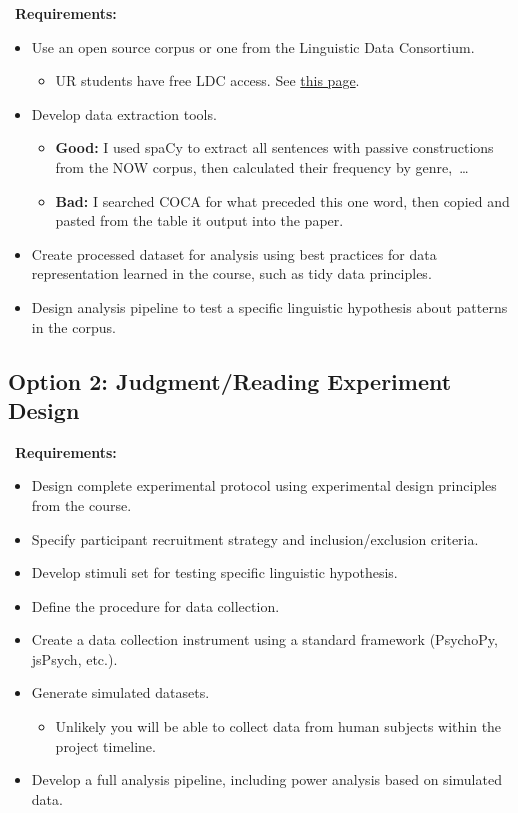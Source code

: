 \documentclass[10pt,letterpaper]{article}
\begin{document}
\begin{graybox}
\faClipboardCheck\ \textbf{Requirements:}
\begin{itemize}
  \item Use an open source corpus or one from the Linguistic Data Consortium.
    \begin{itemize}
      \item UR students have free LDC access. See \href{https://www.library.rochester.edu/about/policies/linguistic-data-consortium-ldc}{this page}.
    \end{itemize}
  \item Develop data extraction tools.
    \begin{itemize}
      \item \textbf{Good:} I used spaCy to extract all sentences with passive constructions from the NOW corpus, then calculated their frequency by genre,~\ldots
      \item \textbf{Bad:} I searched COCA for what preceded this one word, then copied and pasted from the table it output into the paper.
    \end{itemize}
  \item Create processed dataset for analysis using best practices for data representation learned in the course, such as tidy data principles.
  \item Design analysis pipeline to test a specific linguistic hypothesis about patterns in the corpus.
\end{itemize}
\end{graybox}

\subsection{Option 2: Judgment/Reading Experiment Design}

\begin{graybox}
\faFlask\ \textbf{Requirements:}
\begin{itemize}
  \item Design complete experimental protocol using experimental design principles from the course.
  \item Specify participant recruitment strategy and inclusion/exclusion criteria.
  \item Develop stimuli set for testing specific linguistic hypothesis.
  \item Define the procedure for data collection.
  \item Create a data collection instrument using a standard framework (PsychoPy, jsPsych, etc.).
  \item Generate simulated datasets.
    \begin{itemize}
      \item Unlikely you will be able to collect data from human subjects within the project timeline.
    \end{itemize}
  \item Develop a full analysis pipeline, including power analysis based on simulated data.
\end{itemize}
\end{graybox}
\end{document}
